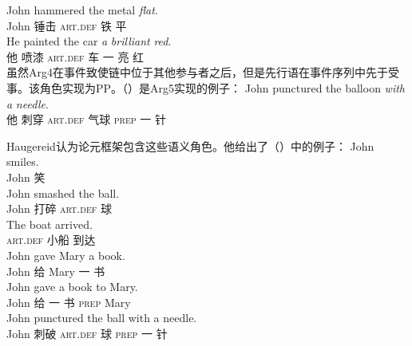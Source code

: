 \begin{exe}
\begin{xlist}[iv.]
\begin{exe}
\begin{xlist}[iv.]
\ex 
\gll John hammered the metal \emph{flat}.\\
     John 锤击 \textsc{art}.\textsc{def} 铁 平\\
\ex 
\gll He painted the car \emph{a} \emph{brilliant} \emph{red}.\\
     他 喷漆 \textsc{art}.\textsc{def} 车 一 亮 红\\
\zl
虽然Arg4在事件致使链中位于其他参与者之后，但是先行语在事件序列中先于受事。该角色实现为PP。（）是Arg5实现的例子：
\ea
\gll John punctured the balloon \emph{with} \emph{a} \emph{needle}.\\
     他 刺穿 \textsc{art}.\textsc{def} 气球 \textsc{prep} 一 针\\
\z

\noindent
Haugereid认为论元框架包含这些语义角色。他给出了（）中的例子：
\eal
\settowidth{}
\ex 
\gll John smiles.           \\
     John 笑\\
\ex 
\gll John smashed the ball. \\
     John 打碎 \textsc{art}.\textsc{def} 球\\
\ex 
\gll The boat arrived.      \\
     \textsc{art}.\textsc{def} 小船 到达\\
\ex
\gll John gave Mary a book. \\
     John 给 Mary 一 书\\
\ex 
\gll John gave a book to Mary.\\
     John 给 一 书 \textsc{prep} Mary\\ 
\ex
\gll John punctured the ball with a needle. \\
     John 刺破 \textsc{art}.\textsc{def} 球 \textsc{prep} 一 针\\
\zl


\end{xlist}
\end{exe}
\end{xlist}
\end{exe}
